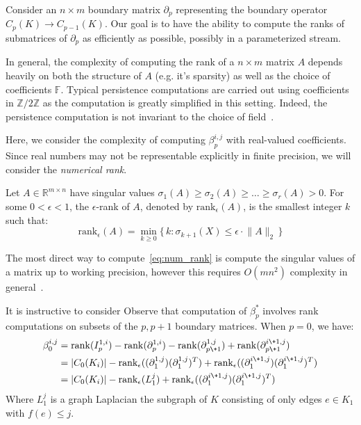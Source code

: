 Consider an $n \times m$ boundary matrix $\partial_p$ representing the boundary operator $C_p(K) \to C_{p-1}(K)$. 
Our goal is to have the ability to compute the ranks of submatrices of $\partial_p$ as efficiently as possible, possibly in a parameterized stream.

In general, the complexity of computing the rank of a $n \times m$ matrix $A$ depends heavily on both the structure of $A$ (e.g. it's sparsity) as well as the choice of coefficients $\mathbb{F}$. Typical persistence computations are carried out using coefficients in $\mathbb{Z}/2\mathbb{Z}$ as the computation is greatly simplified in this setting. 
Indeed, the persistence computation is not invariant to the choice of field~\cite{}.

Here, we consider the complexity of computing $\beta_p^{i,j}$ with real-valued coefficients. Since real numbers may not be representable explicitly in finite precision, we will consider the \emph{numerical rank}.
\begin{definition}
Let $A \in \mathbb{R}^{m \times n}$ have singular values $\sigma_1(A) \geq \sigma_2(A) \geq \dots \geq \sigma_r(A) > 0$. For some $0 < \epsilon < 1$, the $\epsilon$-rank of $A$, denoted by $\mathrm{rank}_{\epsilon}(A)$, is the smallest integer $k$ such that: 
\begin{equation}\label{eq:num_rank}
	\mathrm{rank}_{\epsilon}(A) = %
	\min_{k \geq 0} \{ \, k : \sigma_{k+1}(X) \leq \epsilon \cdot \lVert A \rVert_2 \, \} 
\end{equation}
\end{definition}
\noindent
The most direct way to compute~\eqref{eq:num_rank} is compute the singular values of a matrix up to working precision, however this requires $O(mn^2)$ complexity in general~\cite{}. 

It is instructive to consider 
Observe that computation of $\beta_p^{\ast}$ involves rank computations on subsets of the $p, p+1$ boundary matrices. When $p = 0$, we have: 
\begin{align*}
	\beta_0^{i,j} &= \mathrm{rank}(I_p^{1,i}) - \mathrm{rank}(\partial_p^{1,i}) - \mathrm{rank}(\partial_{p\+1 }^{1,j}) + \mathrm{rank}(\partial_{p\+1}^{i \+ 1, j} ) \\
	&= \lvert C_0(K_i) \rvert - \mathrm{rank}_{\epsilon}((\partial_{1 }^{1,j}) (\partial_{1 }^{1,j})^T ) + \mathrm{rank}_\epsilon((\partial_{1}^{i \+ 1, j})(\partial_{1}^{i \+ 1, j})^T) \\
	&= \lvert C_0(K_i) \rvert - \mathrm{rank}_{\epsilon}(L_1^{j}) + \mathrm{rank}_\epsilon((\partial_{1}^{i \+ 1, j})(\partial_{1}^{i \+ 1, j})^T)
\end{align*}  
Where $L_1^j$ is a graph Laplacian the subgraph of $K$ consisting of only edges $e \in K_1$ with $f(e) \leq j$.



